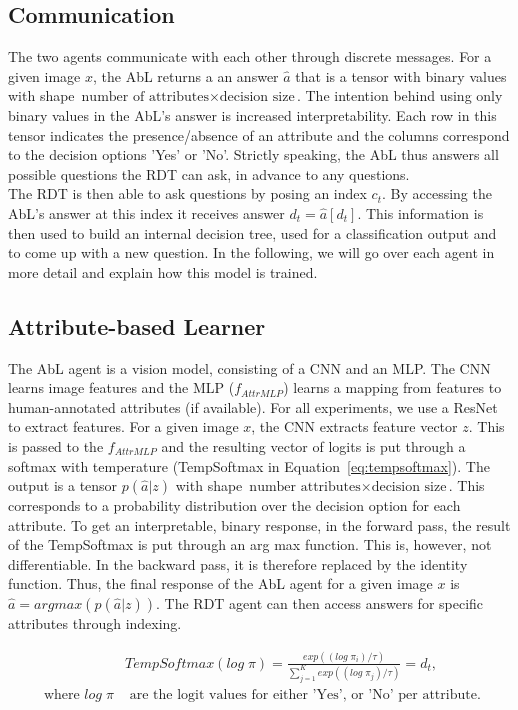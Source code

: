 \documentclass[a4paper,cleardoubleempty,BCOR1cm, 11pt]{report}
\begin{document}
\subsection{Communication}
The two agents communicate with each other through discrete messages. For a given image $x$, the AbL returns a an answer $\hat{a}$ that is a tensor with binary values with shape $\text{number of attributes} \times \text{decision size}$. The intention behind using only binary values in the AbL's answer is increased interpretability. Each row in this tensor indicates the presence/absence of an attribute and the columns correspond to the decision options 'Yes' or 'No'. Strictly speaking, the AbL thus answers all possible questions the RDT can ask, in advance to any questions.\\
The RDT is then able to ask questions by posing an index $c_t$. By accessing the AbL's answer at this index it receives answer $d_t = \hat{a}[d_t]$. This information is then used to build an internal decision tree, used for a classification output and to come up with a new question. In the following, we will go over each agent in more detail and explain how this model is trained.


\subsection{Attribute-based Learner}
The AbL agent is a vision model, consisting of a CNN and an MLP. The CNN learns image features and the MLP ($f_{AttrMLP}$) learns a mapping from features to human-annotated attributes (if available). For all experiments, we use a ResNet \cite{he2016deep} to extract features. For a given image $x$, the CNN extracts feature vector $z$. This is passed to the $f_{AttrMLP}$ and the resulting vector of logits is put through a softmax with temperature (TempSoftmax in Equation~\ref{eq:tempsoftmax}). The output is a tensor $p(\hat{a}|z)$ with shape $\text{number attributes} \times \text{decision size}$. This corresponds to a probability distribution over the decision option for each attribute. To get an interpretable, binary response, in the forward pass, the result of the TempSoftmax is put through an arg max function. This is, however, not differentiable. In the backward pass, it is therefore replaced by the identity function. Thus, the final response of the AbL agent for a given image $x$ is $\hat{a} = argmax(p(\hat{a}|z))$. The RDT agent can then access answers for specific attributes through indexing.

\begin{align}\label{eq:tempsoftmax}
&TempSoftmax(log\;\pi) = \frac{exp((log\;\pi_i)/\tau)}{\sum_{j=1}^{K}exp((log\;\pi_j)/\tau)} = d_t,\\
\text{ where }
log\;\pi &\text{ are the logit values for either 'Yes', or 'No' per attribute.}%
\end{align}
\end{document}
